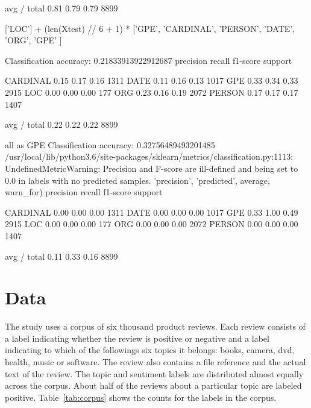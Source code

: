 \documentclass[11pt]{article}
\begin{document}
avg / total       0.81      0.79      0.79      8899

['LOC'] + (len(Xtest) // 6 + 1) * ['GPE', 'CARDINAL', 'PERSON', 'DATE', 'ORG', 'GPE' ]

Classification accuracy: 0.21833913922912687
             precision    recall  f1-score   support

   CARDINAL       0.15      0.17      0.16      1311
       DATE       0.11      0.16      0.13      1017
        GPE       0.33      0.34      0.33      2915
        LOC       0.00      0.00      0.00       177
        ORG       0.23      0.16      0.19      2072
     PERSON       0.17      0.17      0.17      1407

avg / total       0.22      0.22      0.22      8899

all as GPE
Classification accuracy: 0.32756489493201485
/usr/local/lib/python3.6/site-packages/sklearn/metrics/classification.py:1113: UndefinedMetricWarning: Precision and F-score are ill-defined and being set to 0.0 in labels with no predicted samples.
  'precision', 'predicted', average, warn_for)
             precision    recall  f1-score   support

   CARDINAL       0.00      0.00      0.00      1311
       DATE       0.00      0.00      0.00      1017
        GPE       0.33      1.00      0.49      2915
        LOC       0.00      0.00      0.00       177
        ORG       0.00      0.00      0.00      2072
     PERSON       0.00      0.00      0.00      1407

avg / total       0.11      0.33      0.16      8899





\section{Data}

The study uses a corpus of six thousand product reviews. Each review consists of a label indicating whether the review is positive or negative and a label indicating to which of the followings six topics it belongs: books, camera, dvd, health, music or software. The review also contains a file reference and the actual text of the review. The topic and sentiment labels are distributed almost equally across the corpus. About half of the reviews about a particular topic are labeled positive. Table~\ref{tab:corpus} shows the counts for the labels in the corpus.
\end{document}
